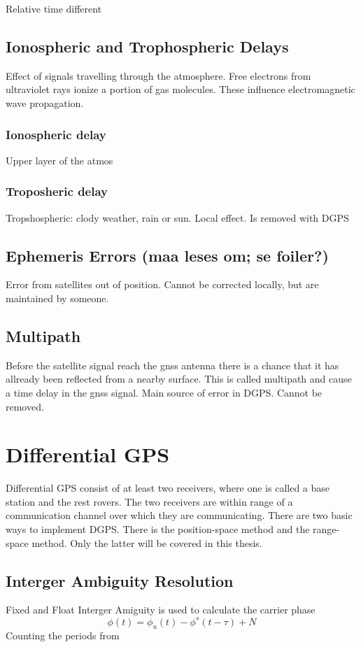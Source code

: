 Relative time different
\subsection{Ionospheric and Trophospheric Delays}
Effect of signals travelling through the atmosphere. Free electrons from ultraviolet rays ionize a portion of gas molecules. These influence electromagnetic wave propagation.
\subsubsection{Ionospheric delay}
Upper layer of the atmos

\subsubsection{Troposheric delay}


Tropshospheric: clody weather, rain or sun. Local effect. Is removed with DGPS
\subsection{Ephemeris Errors (maa leses om; se foiler?)}
Error from satellites out of position. Cannot be corrected locally, but are maintained by someone.
\subsection{Multipath}
Before the satellite signal reach the gnss antenna there is a chance that it has allready been reflected from a nearby surface. This is called multipath and cause a time delay in the gnss signal. 
Main source of error in DGPS. Cannot be removed.
\section{Differential GPS}
Differential GPS consist of at least two receivers, where one is called a base station and the rest rovers. The two receivers are within range of a communication channel over which they are communicating. There are two basic ways to implement DGPS. There is the position-space method and the range-space method. Only the latter will be covered in this thesis.
\subsection{Interger Ambiguity Resolution}
Fixed and Float
Interger Amiguity is used to calculate the carrier phase
\begin{equation}
\phi(t) = \phi_u(t)-\phi^s(t-\tau)+N
\end{equation}
Counting the periods from


